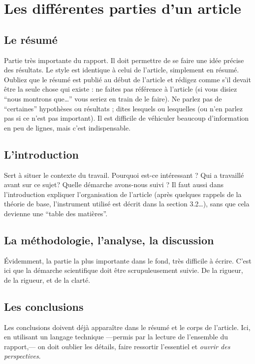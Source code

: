 \documentclass{ipgpmaster}
\begin{document}
\section{Les différentes parties d'un article}


\subsection{Le résumé}

Partie très importante du rapport.
Il doit permettre de se faire une idée précise des résultats.
Le style est identique à celui de l'article, simplement en résumé.
Oubliez que le résumé est publié au début de l'article et rédigez 
comme s'il devait être la seule chose qui existe : ne faites pas 
référence à l'article (si vous disiez ``nous montrons que\dots'' 
vous seriez en train de le faire). 
Ne parlez pas de ``certaines'' hypothèses ou résultats ; dites lesquels 
ou lesquelles (ou n'en parlez pas si ce n'est pas important). Il est difficile de véhiculer beaucoup 
d'information en peu de lignes, mais c'est indispensable.


\subsection{L'introduction}

Sert à situer le contexte du travail. Pourquoi est-ce intéressant ? 
Qui a travaillé avant sur ce sujet? Quelle démarche avons-nous suivi ?
Il faut aussi dans l'introduction expliquer l'organisation de l'article 
(après quelques rappels de la théorie de base,  l'instrument 
utilisé est décrit dans la section 3.2\dots), sans que cela 
devienne une ``table des matières''.


\subsection{La méthodologie, l'analyse, la discussion}

Évidemment, la partie la plus importante dans le fond, très difficile 
à écrire. C'est ici que la démarche scientifique doit être 
scrupuleusement suivie. De la rigueur, de la rigueur, et de la clarté.


\subsection{Les conclusions}

Les conclusions doivent déjà apparaître dans le résumé et le 
corps de l'article. Ici, en utilisant un langage technique ---permis par la
lecture de l'ensemble du rapport,--- on doit oublier les détails, faire ressortir l'essentiel et \emph{ouvrir des perspectives\/}.
\end{document}
